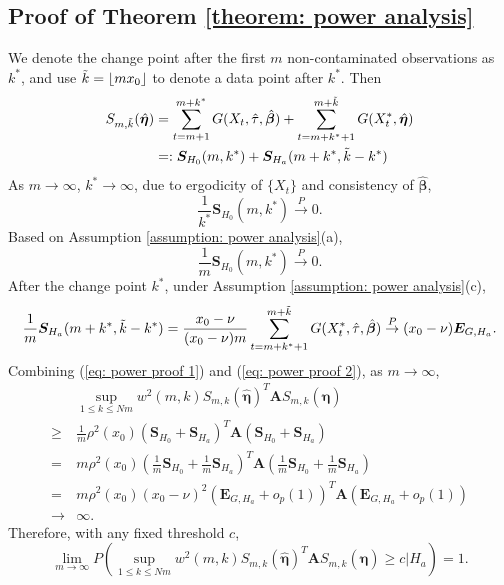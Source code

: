 \documentclass{article}
\theoremstyle{definition}
\begin{document}
\subsection{Proof of Theorem \ref{theorem: power analysis}}
\label{app: proof of power analysis}
We denote the change point after the first $m$ non-contaminated observations as $k^*$, and use $\Tilde{k} = \lfloor m x_0 \rfloor$ to denote a data point after $k^*$. Then 
\begin{equation*}
\begin{aligned}
        S_{m,\Tilde{k}}(\hat{\bm{\eta}}) &= \sum_{t=m+1}^{m+k^*} G(X_t,\hat{\tau}, \hat{\bm{\beta}})+ \sum_{t=m+k^*+1}^{m+\Tilde{k}} G(X_t^*,\hat{\bm{\eta}})\\
                            &=: \bm{S}_{H_0}(m,k^*)+\bm{S}_{H_a}(m+k^*,\Tilde{k}-k^*)
\end{aligned}
\end{equation*}
As $m \rightarrow \infty$, $k^* \rightarrow \infty$, due to ergodicity of $\{X_t\}$ and consistency of $\hat{\bm{\beta}}$,
\begin{equation*}
    \frac{1}{k^*} \bm{S}_{H_0}(m,k^*) \overset{P}{\rightarrow}0.
\end{equation*}
Based on Assumption \ref{assumption: power analysis}(a),
\begin{equation}
\label{eq: power proof 1}
    \frac{1}{m} \bm{S}_{H_0}(m,k^*) \overset{P}{\rightarrow}0.
\end{equation}
After the change point $k^*$, under Assumption \ref{assumption: power analysis}(c), 
\begin{equation}
\label{eq: power proof 2}
    \frac{1}{m}\bm{S}_{H_a}(m+k^*,\Tilde{k}-k^*) = \frac{x_0-\nu}{(x_0-\nu)m} \sum_{t = m+k^*+1}^{m+\Tilde{k}}G(X_t^*,\hat{\tau}, \hat{\bm{\beta}}) \overset{P}{\rightarrow} (x_0-\nu) \bm{E}_{G,H_a}.
\end{equation}
Combining (\ref{eq: power proof 1}) and (\ref{eq: power proof 2}), as $m \rightarrow \infty$,
\begin{equation*}
    \begin{aligned}
    & \underset{1\leq k \leq Nm}{\sup}w^2(m,k)S_{m,k}(\hat{\bm{\eta}})^T\bm{A}S_{m,k}(\hat{\bm{\eta}}) \\
    \geq & \frac{1}{m}\rho^2(x_0) (\bm{S}_{H_0}+\bm{S}_{H_a})^T \bm{A} (\bm{S}_{H_0}+\bm{S}_{H_a})\\
    =&m \rho^2(x_0) (\frac{1}{m}\bm{S}_{H_0}+\frac{1}{m}\bm{S}_{H_a})^T \bm{A} (\frac{1}{m}\bm{S}_{H_0}+\frac{1}{m}\bm{S}_{H_a}) \\
     = & m\rho^2(x_0)(x_0-\nu)^2 (\bm{E}_{G,H_a}+o_p(1))^T \bm{A} (\bm{E}_{G,H_a}+o_p(1)) \\
     \rightarrow & \infty.
    \end{aligned}
\end{equation*}
Therefore, with any fixed threshold $c$,
\begin{equation*}
    \underset{m \rightarrow \infty}{\lim} P\left(\underset{1\leq k \leq Nm}{\sup}w^2(m,k)S_{m,k}(\hat{\bm{\eta}})^T\bm{A}S_{m,k}(\hat{\bm{\eta}}) \geq c  |H_a  \right) = 1.
\end{equation*}

 

\end{document}

